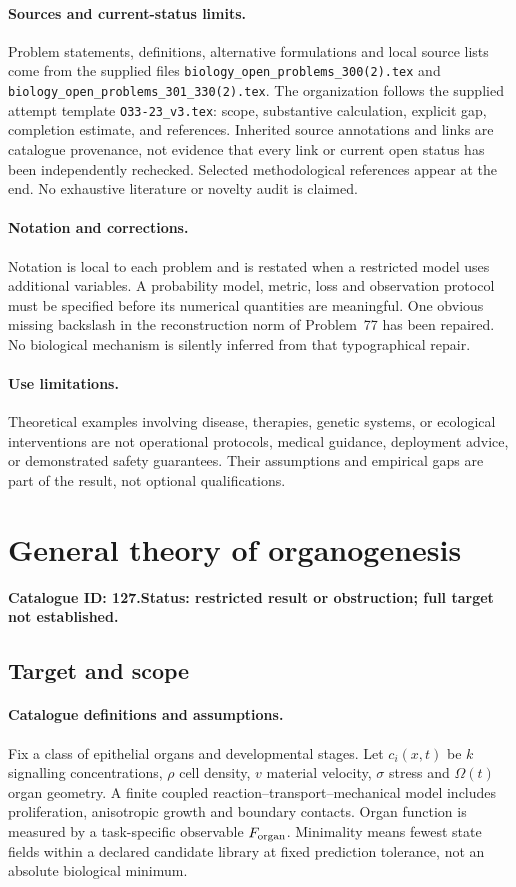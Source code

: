 \documentclass[11pt]{article}
\begin{document}
\paragraph{Sources and current-status limits.}
Problem statements, definitions, alternative formulations and local source lists
come from the supplied files
\texttt{biology\_open\_problems\_300(2).tex} and
\texttt{biology\_open\_problems\_301\_330(2).tex}.
The organization follows the supplied attempt template
\texttt{O33-23\_v3.tex}: scope, substantive calculation, explicit gap,
completion estimate, and references. Inherited source annotations and links are
catalogue provenance, not evidence that every link or current open status has
been independently rechecked. Selected methodological references appear at the
end. No exhaustive literature or novelty audit is claimed.

\paragraph{Notation and corrections.}
Notation is local to each problem and is restated when a restricted model uses
additional variables. A probability model, metric, loss and observation protocol
must be specified before its numerical quantities are meaningful. One obvious
missing backslash in the reconstruction norm of Problem~77 has been repaired.
No biological mechanism is silently inferred from that typographical repair.

\paragraph{Use limitations.}
Theoretical examples involving disease, therapies, genetic systems, or ecological
interventions are not operational protocols, medical guidance, deployment advice,
or demonstrated safety guarantees. Their assumptions and empirical gaps are part
of the result, not optional qualifications.

\setcounter{section}{126}
\section{General theory of organogenesis}
\label{prob:127}
\noindent\textbf{Catalogue ID: 127.}\quad \textbf{Status: restricted result or obstruction; full target not established.}
\subsection{Target and scope}
\paragraph{Catalogue definitions and assumptions.}
Fix a class of epithelial organs and developmental stages. Let $c_i(x,t)$ be $k$ signalling concentrations, $\rho$ cell density, $v$ material velocity, $\sigma$ stress and $\Omega(t)$ organ geometry. A finite coupled reaction--transport--mechanical model includes proliferation, anisotropic growth and boundary contacts. Organ function is measured by a task-specific observable $F_{\rm organ}$. Minimality means fewest state fields within a declared candidate library at fixed prediction tolerance, not an absolute biological minimum.
\end{document}
